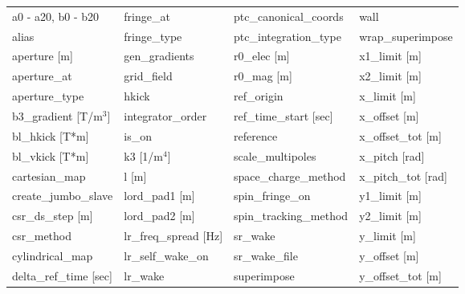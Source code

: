  \begin{tabular}{llll} \toprule
a0 - a20, b0 - b20               & fringe_at                        & ptc_canonical_coords             & wall                             \\
alias                            & fringe_type                      & ptc_integration_type             & wrap_superimpose                 \\
aperture [m]                     & gen_gradients                    & r0_elec [m]                      & x1_limit [m]                     \\
aperture_at                      & grid_field                       & r0_mag [m]                       & x2_limit [m]                     \\
aperture_type                    & hkick                            & ref_origin                       & x_limit [m]                      \\
b3_gradient [T/m$^3$]            & integrator_order                 & ref_time_start [sec]             & x_offset [m]                     \\
bl_hkick [T*m]                   & is_on                            & reference                        & x_offset_tot [m]                 \\
bl_vkick [T*m]                   & k3 [1/m$^4$]                     & scale_multipoles                 & x_pitch [rad]                    \\
cartesian_map                    & l [m]                            & space_charge_method              & x_pitch_tot [rad]                \\
create_jumbo_slave               & lord_pad1 [m]                    & spin_fringe_on                   & y1_limit [m]                     \\
csr_ds_step [m]                  & lord_pad2 [m]                    & spin_tracking_method             & y2_limit [m]                     \\
csr_method                       & lr_freq_spread [Hz]              & sr_wake                          & y_limit [m]                      \\
cylindrical_map                  & lr_self_wake_on                  & sr_wake_file                     & y_offset [m]                     \\
delta_ref_time [sec]             & lr_wake                          & superimpose                      & y_offset_tot [m]                 \\

\end{tabular}
